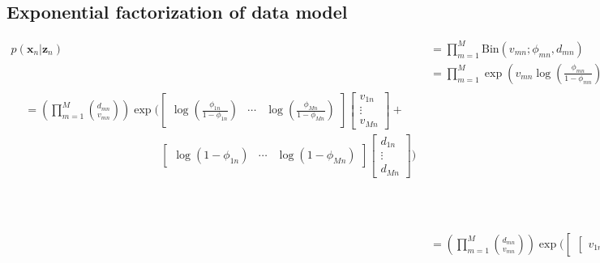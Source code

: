 \documentclass[11pt]{article}
\newcommand{\bx}{\ensuremath{\mathbf{x}}}
\newcommand{\bz}{\ensuremath{\mathbf{z}}}
\begin{document}
\subsection{Exponential factorization of data model}
\vspace{-0.5cm}
\begin{align}
p(\bx_n | \bz_n) &= \prod\limits_{m=1}^M \mathrm{Bin}(v_{mn}; \phi_{mn}, d_{mn}) \nonumber \\
				 &= \prod\limits_{m=1}^M \exp\left(v_{mn} \log\left(\frac{\phi_{mn}}{1 - \phi_{mn}}\right) + (d_{mn} - v_{mn}) \log(1 - \phi_{mn}) \right) \nonumber \\				 		
\begin{split}
				&=\left( \prod\limits_{m=1}^M \binom{d_{mn}}{v_{mn}} \right)
				\exp\bigg( 
\begin{bmatrix}
         \log\left(\frac{\phi_{1n}}{1 - \phi_{1n}}\right) & \cdots & \log\left(\frac{\phi_{Mn}}{1 - \phi_{Mn}}\right)
        \end{bmatrix}\begin{bmatrix}
         v_{1n} \\ \vdots \\ v_{Mn}
        \end{bmatrix}  + \\
& \qquad \qquad\qquad\qquad\qquad\qquad \begin{bmatrix}
         \log\left(1 - \phi_{1n}\right) & \cdots & \log\left(1 - \phi_{Mn}\right)
        \end{bmatrix}      
                \begin{bmatrix}
         d_{1n} \\ \vdots \\ d_{Mn}
        \end{bmatrix} 
        \bigg)
        \end{split} \\
&=    \left( \prod\limits_{m=1}^M \binom{d_{mn}}{v_{mn}} \right)
			 \exp\bigg(
			\begin{bmatrix}
				\begin{bmatrix}
				 v_{1n} &  d_{1n}
				\end{bmatrix} & \cdots &
				\begin{bmatrix}
				 v_{Mn} &  d_{Mn}
				\end{bmatrix}
			\end{bmatrix}
			\begin{bmatrix}
				\begin{bmatrix}
					\log\left(1 - \phi_{1n}\right) \\ \log\left(\frac{\phi_{1n}}{1 - \phi_{1n}}\right)
				\end{bmatrix} \\
				\vdots \\
				\begin{bmatrix}
					\log\left(1 - \phi_{Mn}\right) \\ \log\left(\frac{\phi_{Mn}}{1 - \phi_{Mn}}\right)
				\end{bmatrix}
			\end{bmatrix} \bigg)\\
\end{align}
\end{document}
